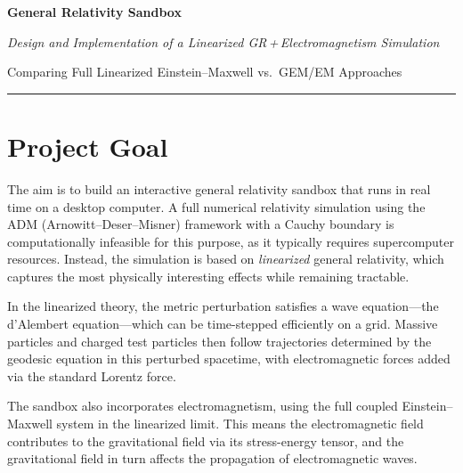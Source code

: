 \documentclass[11pt,a4paper]{article}
\begin{document}

\begin{titlepage}
  \centering
  \vspace*{3cm}
  {\Huge\bfseries\color{deepblue} General Relativity Sandbox\par}
  \vspace{0.8cm}
  {\large\itshape Design and Implementation of a Linearized GR\,+\,Electromagnetism Simulation\par}
  \vspace{0.4cm}
  {\normalsize\color{gray} Comparing Full Linearized Einstein--Maxwell vs.\ GEM/EM Approaches\par}
  \vspace{2cm}
  \hrule
\end{titlepage}

\tableofcontents
\newpage

\section{Project Goal}

The aim is to build an interactive general relativity sandbox that runs in real time on a desktop computer.  A full numerical relativity simulation using the ADM (Arnowitt--Deser--Misner) framework with a Cauchy boundary is computationally infeasible for this purpose, as it typically requires supercomputer resources.  Instead, the simulation is based on \emph{linearized} general relativity, which captures the most physically interesting effects while remaining tractable.

In the linearized theory, the metric perturbation satisfies a wave equation---the d'Alembert equation---which can be time-stepped efficiently on a grid.  Massive particles and charged test particles then follow trajectories determined by the geodesic equation in this perturbed spacetime, with electromagnetic forces added via the standard Lorentz force.

The sandbox also incorporates electromagnetism, using the full coupled Einstein--Maxwell system in the linearized limit.  This means the electromagnetic field contributes to the gravitational field via its stress-energy tensor, and the gravitational field in turn affects the propagation of electromagnetic waves.

\end{document}
